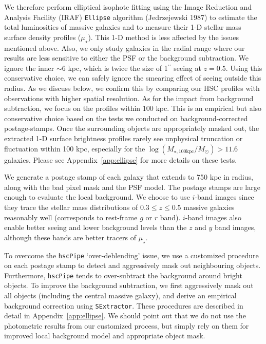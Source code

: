 \documentclass[fleqn,usenatbib]{mnras}
\def\asec{$^{\prime\prime}$}
\def\logmtot{{$\log (M_{\star,100\mathrm{kpc}}/M_{\odot})$}}
\def\mden{{$\mu_{\star}$}}
\begin{document}
    We therefore perform elliptical isophote fitting using the Image Reduction 
    and Analysis Facility (IRAF) \texttt{Ellipse} algorithm (Jedrzejewski 1987) 
    to estimate the total luminosities of massive galaxies and to measure their 
    1-D stellar mass surface density profiles (\mden{}). 
    This 1-D method is less affected by the issues mentioned above. 
    Also, we only study galaxies in the radial range where our results are less 
    sensitive to either the PSF or the background subtraction.
    We ignore the inner $\sim6$ kpc, which is twice the size of 1\asec{} seeing 
    at $z=0.5$.
    Using this conservative choice, we can safely ignore the smearing effect of 
    seeing outside this radius.
    As we discuss below, we confirm this by comparing our HSC profiles with 
    observations with higher spatial resolution. 
    As for the impact from background subtraction, we focus on the profiles 
    within 100 kpc. 
    This is an empirical but also conservative choice based on the tests we 
    conducted on background-corrected postage-stamps. 
    Once the surrounding objects are appropriately masked out, the extracted 1-D 
    surface brightness profiles rarely see unphysical truncation or fluctuation 
    within 100 kpc, especially for the \logmtot{}$>11.6$ galaxies. 
    Please see Appendix~\ref{app:ellipse} for more details on these tests.
    
    We generate a postage stamp of each galaxy that extends to 750 kpc in radius, 
    along with the bad pixel mask and the PSF model. 
    The postage stamps are large enough to evaluate the local background. 
    We choose to use $i$-band images since they trace the stellar mass distributions 
    of $0.3 \leq z \leq 0.5$ massive galaxies reasonably well 
    (corresponds to rest-frame $g$ or $r$ band). $i$-band images also enable better 
    seeing and lower background levels than the $z$ and $y$ band images, although 
    these bands are better tracers of \mden{}. 
    
    To overcome the \texttt{hscPipe} `over-deblending' issue, we use a customized 
    procedure on each postage stamp to detect and aggressively mask out 
    neighbouring objects. 
    Furthermore, \texttt{hscPipe} tends to over-subtract the background around 
    bright objects. 
    To improve the background subtraction, we first aggressively mask 
    out all objects (including the central massive galaxy), and derive an 
    empirical background correction using \texttt{SExtractor}.
    These procedures are described in detail in Appendix~\ref{app:ellipse}. 
    We should point out that we do not use the photometric results from our 
    customized process, but simply rely on them for improved local background model
    and appropriate object mask.
\end{document}
